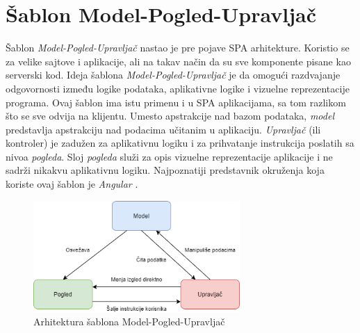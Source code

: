 \documentclass[12pt,oneside]{memoir}
\begin{document}
\section{Šablon Model-Pogled-Upravljač}

Šablon \emph{Model-Pogled-Upravljač} nastao je pre pojave SPA arhitekture.
Koristio se za velike sajtove i aplikacije, ali na takav način da su sve komponente pisane
kao serverski kod. Ideja šablona \emph{Model-Pogled-Upravljač} je da omogući razdvajanje odgovornosti
između logike podataka, aplikativne logike i vizuelne reprezentacije programa.
Ovaj šablon ima istu primenu i u SPA aplikacijama, sa tom razlikom što se sve odvija na klijentu.
Umesto apstrakcije nad bazom podataka, \emph{model} predstavlja apstrakciju nad podacima učitanim
u aplikaciju. \emph{Upravljač} (ili kontroler) je zadužen za aplikativnu logiku i za prihvatanje
instrukcija poslatih sa nivoa \emph{pogleda}. Sloj \emph{pogleda} služi za opis vizuelne
reprezentacije aplikacije i ne sadrži nikakvu aplikativnu logiku. Najpoznatiji predstavnik okruženja
koja koriste ovaj šablon je \emph{Angular} \cite{Angular}.
\begin{figure}[!ht]
  \centering
  \includegraphics[width=0.7\textwidth]{slike/MVC_pattern (1).png}
  \caption{Arhitektura šablona Model-Pogled-Upravljač}
  \label{fig:MVC}
\end{figure}
\end{document}

